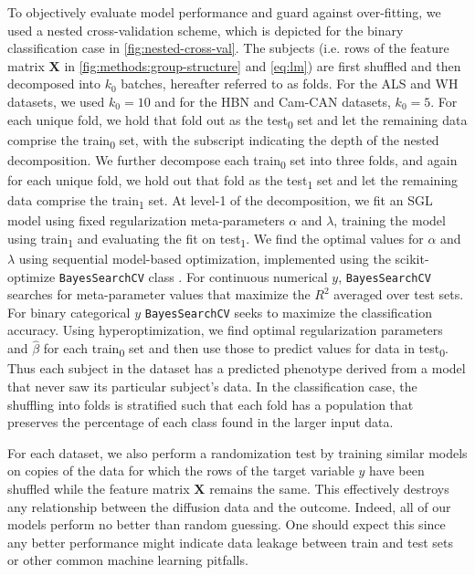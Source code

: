 \documentclass[10pt,letterpaper]{article}
\begin{document}
To objectively evaluate model performance and guard against over-fitting,
we used a nested cross-validation scheme, which is depicted for the binary
classification case in \cref{fig:nested-cross-val}. The subjects (i.e. rows
of the feature matrix $\mathbf{X}$ in \cref{fig:methods:group-structure}
and \cref{eq:lm}) are first shuffled and then decomposed into $k_0$ batches,
hereafter referred to as folds. For the ALS and WH datasets, we used $k_0 =
10$ and for the HBN and Cam-CAN datasets, $k_0 = 5$. For each unique fold, we
hold that fold out as the test\textsubscript{0} set and let the remaining
data comprise the train\textsubscript{0} set, with the subscript indicating
the depth of the nested decomposition. We further decompose each
train\textsubscript{0} set into three folds, and again for each unique fold,
we hold out that fold as the test\textsubscript{1} set and let the remaining
data comprise the train\textsubscript{1} set. At level-1 of the
decomposition, we fit an SGL model using fixed regularization meta-parameters
$\alpha$ and $\lambda$, training the model using train\textsubscript{1} and
evaluating the fit on test\textsubscript{1}. We find the optimal values for
$\alpha$ and $\lambda$ using sequential model-based optimization, implemented
using the scikit-optimize \lstinline|BayesSearchCV| class \cite{scikit_optimize}.
For continuous numerical $y$, \lstinline|BayesSearchCV| searches for
meta-parameter values that maximize the $R^2$ averaged over test sets. For
binary categorical $y$ \lstinline|BayesSearchCV| seeks to maximize the
classification accuracy. Using hyperoptimization, we find optimal
regularization parameters and $\hat{\beta}$ for each train\textsubscript{0}
set and then use those to predict values for data in test\textsubscript{0}.
Thus each subject in the dataset has a predicted phenotype derived from a
model that never saw its particular subject's data. In the classification
case, the shuffling into folds is stratified such that each fold has a
population that preserves the percentage of each class found in the larger
input data.

For each dataset, we also perform a randomization test by training similar
models on copies of the data for which the rows of the target variable $y$
have been shuffled while the feature matrix $\mathbf{X}$ remains the same.
This effectively destroys any relationship between the diffusion data and the
outcome. Indeed, all of our models perform no better than random guessing.
One should expect this since any better performance might indicate data
leakage between train and test sets \cite{kaufman2012leakage} or other common
machine learning pitfalls.
\end{document}
